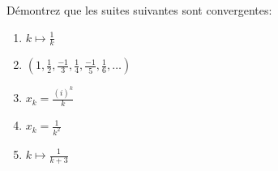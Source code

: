 
\begin{exercice}\label{exo0007}

 Démontrez que les suites suivantes sont convergentes:
\begin{enumerate}
\item $k \mapsto \frac{1}{k}$
\item $(1, \frac{1}{2}, \frac{-1}{3}, \frac{1}{4}, \frac{-1}{5},\frac{1}{6}, \ldots )$
\item $x_k = \frac{(i)^k}{k}$
\item $x_k = \frac{1}{k^2}$
\item $k \mapsto \frac{1}{k+3}$
\end{enumerate}


\end{exercice}
